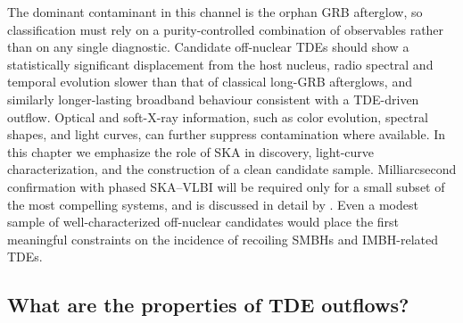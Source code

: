 \documentclass[a4paper,11pt]{article}
\begin{document}
The dominant contaminant in this channel is the orphan GRB afterglow, so classification must rely on a purity-controlled combination of observables rather than on any single diagnostic. Candidate off-nuclear TDEs should show a statistically significant displacement from the host nucleus, radio spectral and temporal evolution slower than that of classical long-GRB afterglows, and similarly longer-lasting broadband behaviour consistent with a TDE-driven outflow. Optical and soft-X-ray information, such as color evolution, spectral shapes, and light curves, can further suppress contamination where available. In this chapter we emphasize the role of SKA in discovery, light-curve characterization, and the construction of a clean candidate sample. Milliarcsecond confirmation with phased SKA--VLBI will be required only for a small subset of the most compelling systems, and is discussed in detail by \citet{Shu.1.2026.SKA}. Even a modest sample of well-characterized off-nuclear candidates would place the first meaningful constraints on the incidence of recoiling SMBHs and IMBH-related TDEs.

\subsection{What are the properties of TDE outflows?
}
\end{document}
